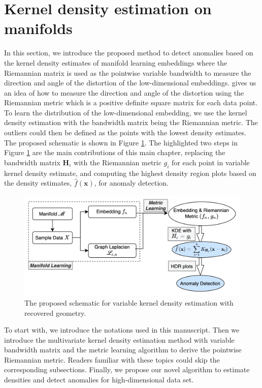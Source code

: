 \documentclass[11pt,a4paper,]{article}
\begin{document}
\hypertarget{vkde}{%
\section{Kernel density estimation on manifolds}\label{vkde}}

In this section, we introduce the proposed method to detect anomalies
based on the kernel density estimates of manifold learning embeddings
where the Riemannian matrix is used as the pointwise variable bandwidth
to measure the direction and angle of the distortion of the
low-dimensional embeddings. \textcite{Perrault-Joncas2013-pq} gives us an idea of
how to measure the direction and angle of the distortion using the
Riemannian metric which is a positive definite square matrix for each
data point. To learn the distribution of the low-dimensional embedding,
we use the kernel density estimation with the bandwidth matrix being the
Riemannian metric. The outliers could then be defined as the points with
the lowest density estimates. The proposed schematic is shown in Figure
\ref{fig:vkde}. The highlighted two steps in Figure \ref{fig:vkde} are
the main contributions of this main chapter, replacing the bandwidth
matrix \(\pmb{H}_i\) with the Riemannian metric \(g_i\) for each point in
variable kernel density estimate, and computing the highest density
region plots based on the density estimates, \(\hat{f}(\pmb{x})\), for
anomaly detection.




\begin{figure}

{\centering \includegraphics[width=0.95\linewidth]{figures/vkde} 

}

\caption{The proposed schematic for variable kernel density
estimation with recovered geometry.}\label{fig:vkde}
\end{figure}

To start with, we introduce the notations used in this manuscript. Then
we introduce the multivariate kernel density estimation method with
variable bandwidth matrix and the metric learning algorithm to derive
the pointwise Riemannian metric. Readers familiar with these topics
could skip the corresponding subsections. Finally, we propose our novel
algorithm to estimate densities and detect anomalies for
high-dimensional data set.
\end{document}
